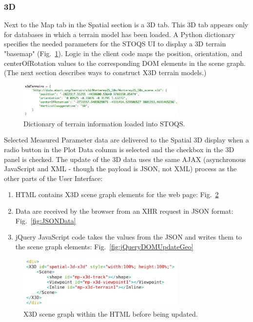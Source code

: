 \documentclass[conference]{IEEEtran}
\begin{document}
\subsubsection{3D}
Next to the Map tab in the Spatial section is a 3D tab. This 3D tab appears only for databases in which a terrain model has been loaded. A Python dictionary specifies the needed parameters for the STOQS UI to display a 3D terrain "basemap" (Fig.~\ref{fig:x3dTerrains}). Logic in the client code maps the position, orientation, and centerOfRotation values to the corresponding DOM elements in the scene graph. (The next section describes ways to construct X3D terrain models.)

\begin{figure}[htbp]
\centering
\includegraphics[width=3.3in]{x3dTerrains.png}
\caption{Dictionary of terrain information loaded into STOQS.}
\label{fig:x3dTerrains}
\end{figure}

Selected Measured Parameter data are delivered to the Spatial 3D display when a radio button in the Plot Data column is selected and the checkbox in the 3D panel is checked. The update of the 3D data uses the same AJAX (asynchronous JavaScript and XML - though the payload is JSON, not XML) process as the other parts of the User Interface:

\begin{enumerate}
\item HTML contains X3D scene graph elements for the web page: Fig.~\ref{fig:Spatial3D_DOM}
\item Data are received by the browser from an XHR request in JSON format: Fig.~\ref{fig:JSONData}
\item jQuery JavaScript code takes the values from the JSON and writes them to the scene graph elements: Fig.~\ref{fig:jQueryDOMUpdateGeo}
\end{enumerate}

\begin{figure}[!htbp]
\centering
\includegraphics[width=3.3in]{Spatial3D_DOM.png}
\caption{X3D scene graph within the HTML before being updated.}
\label{fig:Spatial3D_DOM}
\end{figure}
\end{document}
